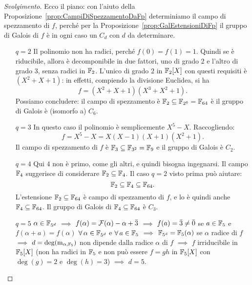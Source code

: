 \begin{proof}[Svolgimento]
Ecco il piano: con l'aiuto della Proposizione~\ref{prop:CampiDiSpezzamentoDaFp} determiniamo il campo di spezzamento di \(f\), perché per la Proposizione~\ref{prop:GalEstensioniDiFp} il gruppo di Galois di \(f\) è in ogni caso un \(C_d\) con \(d\) da determinare.
\begin{itemize}[leftmargin=*]
\item[\(q=2\)] Il polinomio non ha radici, perché \(f(0) = f(1) = 1\). Quindi se è riducibile, allora è decomponibile in due fattori, uno di grado 2 e l'altro di grado 3, senza radici in \(\mathbb{F}_2\). L'unico di grado \(2\) in \(\mathbb{F}_2[X]\) con questi requisiti è \((X^2+X+1)\): in effetti, compiendo la divisione Euclidea, si ha
\[f=(X^2+X+1)(X^3+X^2+1) .\]%
Possiamo concludere: il campo di spezzamento è \(\mathbb{F}_2 \subseteq \mathbb{F}_{2^6} = \mathbb{F}_{64}\) è il gruppo di Galois è (isomorfo a) \(C_6\).
\item[\(q=3\)] In questo caso il polinomio è semplicemente \(X^5-X\). Raccogliendo:
\[f = X^5-X = X(X-1)(X+1)(X^2+1) .\]%
Il campo di spezzamento di \(f\) è \(\mathbb{F}_3 \subseteq \mathbb{F}_{3^2} = \mathbb{F}_9\) e il gruppo di Galois è \(C_2\).
\item[\(q=4\)] Qui \(4\) non è primo, come gli altri, e quindi bisogna ingegnarsi. Il campo \(\mathbb{F}_4\) suggerisce di considerare \(\mathbb{F}_2 \subseteq \mathbb{F}_4\). Il caso \(q = 2\) visto prima può aiutare:
\[\mathbb{F}_2 \subseteq \mathbb{F}_4 \subseteq \mathbb{F}_{64} .\]
L'estensione \(\mathbb{F}_2 \subseteq \mathbb{F}_{64}\) è campo di spezzamento di \(f\), e lo è quindi anche \(\mathbb{F}_4 \subseteq \mathbb{F}_{64}\). Il gruppo di Galois di \(\mathbb{F}_4 \subseteq \mathbb{F}_{64}\) è \(C_3\). 
\item[\(q=5\)]  \(\alpha\in\mathbb{F}_{5^d}\) \(\implies\) \(f(\alpha)=\mathcal{F}(\alpha)-\alpha+\mspace{1mu}\overline{\mspace{-1mu}3\mspace{-1mu}}\mspace{1mu}\) \(\implies\) \(f(a)=\mspace{1mu}\overline{\mspace{-1mu}3\mspace{-1mu}}\mspace{1mu}\ne\mspace{1mu}\overline{\mspace{-1mu}0\mspace{-1mu}}\mspace{1mu}\) se \(a\in\mathbb{F}_5\) e \(f(\alpha+a)=f(\alpha)\) \(\forall\,\alpha\in\mathbb{F}_{5^d}\) e \(\forall\, a\in\mathbb{F}_5\) \(\implies\) \(\mathbb{F}_{5^d}=\mathbb{F}_5(\alpha)\) se \(\alpha\) radice di \(f\) \(\implies\) \(d=\deg(\mathrm{m}_{\alpha,\mathbb{F}_5})\) non dipende dalla radice \(\alpha\) di \(f\) \(\implies\) \(f\) irriducibile in \(\mathbb{F}_5[X]\) (non ha radici in \(\mathbb{F}_5\) e non pu\`o essere \(f=gh\) in \(\mathbb{F}_5[X]\) con \(\deg(g)=2\) e \(\deg(h)=3\)) \(\implies\) \(d=5\).\qedhere
\end{itemize}
\end{proof}

